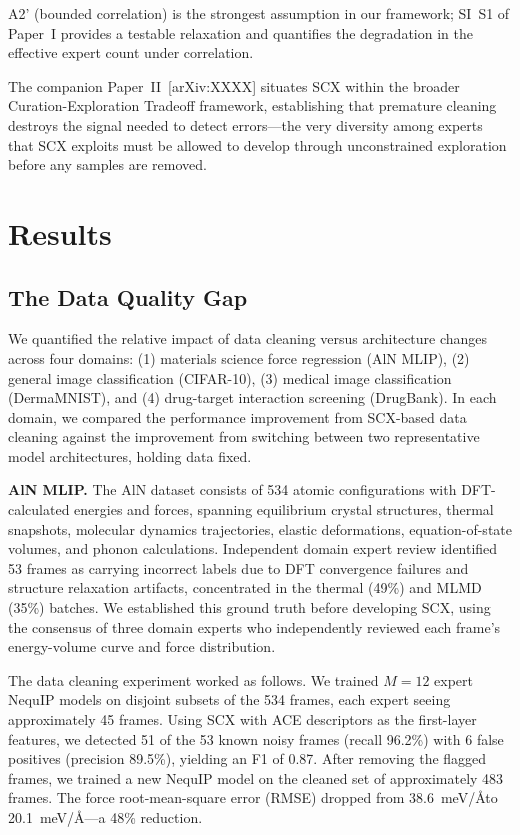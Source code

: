 \documentclass[12pt,a4paper]{article}
\begin{document}
A2' (bounded correlation) is the strongest assumption in our framework; SI~S1 of Paper~I provides a testable relaxation and quantifies the degradation in the effective expert count under correlation.

The companion Paper~II~[arXiv:XXXX] situates SCX within the broader Curation-Exploration Tradeoff framework, establishing that premature cleaning destroys the signal needed to detect errors---the very diversity among experts that SCX exploits must be allowed to develop through unconstrained exploration before any samples are removed.

\section{Results}

\subsection{The Data Quality Gap}

We quantified the relative impact of data cleaning versus architecture changes across four domains: (1) materials science force regression (AlN MLIP), (2) general image classification (CIFAR-10), (3) medical image classification (DermaMNIST), and (4) drug-target interaction screening (DrugBank). In each domain, we compared the performance improvement from SCX-based data cleaning against the improvement from switching between two representative model architectures, holding data fixed.

\textbf{AlN MLIP.} The AlN dataset consists of 534 atomic configurations with DFT-calculated energies and forces, spanning equilibrium crystal structures, thermal snapshots, molecular dynamics trajectories, elastic deformations, equation-of-state volumes, and phonon calculations. Independent domain expert review identified 53 frames as carrying incorrect labels due to DFT convergence failures and structure relaxation artifacts, concentrated in the thermal (49\%) and MLMD (35\%) batches. We established this ground truth before developing SCX, using the consensus of three domain experts who independently reviewed each frame's energy-volume curve and force distribution.

The data cleaning experiment worked as follows. We trained $M=12$ expert NequIP models on disjoint subsets of the 534 frames, each expert seeing approximately 45 frames. Using SCX with ACE descriptors as the first-layer features, we detected 51 of the 53 known noisy frames (recall 96.2\%) with 6 false positives (precision 89.5\%), yielding an F1 of 0.87. After removing the flagged frames, we trained a new NequIP model on the cleaned set of approximately 483 frames. The force root-mean-square error (RMSE) dropped from 38.6~meV/\AA to 20.1~meV/\AA---a 48\% reduction.
\end{document}

